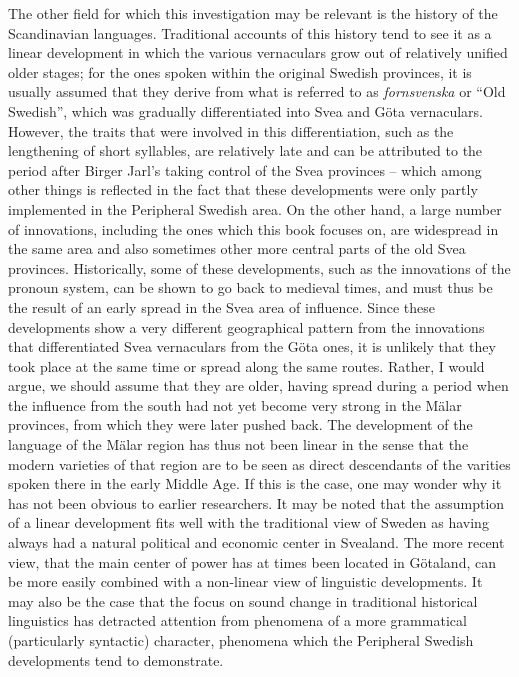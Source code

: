 \begin{styleBodytextC}
The other field for which this investigation may be relevant is the history of the Scandinavian languages. Traditional accounts of this history tend to see it as a linear development in which the various vernaculars grow out of relatively unified older stages; for the ones spoken within the original Swedish provinces, it is usually assumed that they derive from what is referred to as \textit{fornsvenska} or “Old Swedish”, which was gradually differentiated into Svea and Göta vernaculars. However, the traits that were involved in this differentiation, such as the lengthening of short syllables, are relatively late and can be attributed to the period after Birger Jarl’s taking control of the Svea provinces – which among other things is reflected in the fact that these developments were only partly implemented in the Peripheral Swedish area. On the other hand, a large number of innovations, including the ones which this book focuses on, are widespread in the same area and also sometimes other more central parts of the old Svea provinces. Historically, some of these developments, such as the innovations of the pronoun system, can be shown to go back to medieval times, and must thus be the result of an early spread in the Svea area of influence. Since these developments show a very different geographical pattern from the innovations that differentiated Svea vernaculars from the Göta ones, it is unlikely that they took place at the same time or spread along the same routes. Rather, I would argue, we should assume that they are older, having spread during a period when the influence from the south had not yet become very strong in the Mälar provinces, from which they were later pushed back. The development of the language of the Mälar region has thus not been linear in the sense that the modern varieties of that region are to be seen as direct descendants of the varities spoken there in the early Middle Age. If this is the case, one may wonder why it has not been obvious to earlier researchers. It may be noted that the assumption of a linear development fits well with the traditional view of Sweden as having always had a natural political and economic center in Svealand. The more recent view, that the main center of power has at times been located in Götaland, can be more easily combined with a non-linear view of linguistic developments. It may also be the case that the focus on sound change in traditional historical linguistics has detracted attention from phenomena of a more grammatical (particularly syntactic) character, phenomena which the Peripheral Swedish developments tend to demonstrate.

\end{styleBodytextC}

